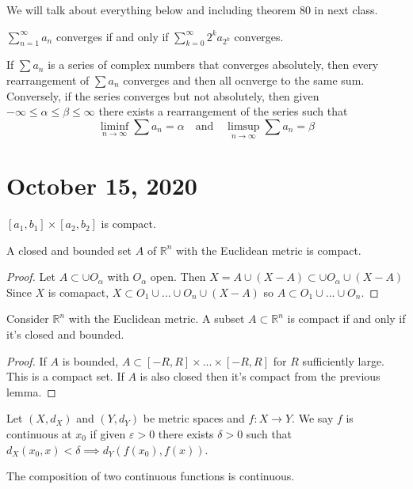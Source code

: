 \documentclass{article}
\newcommand{\R}{\mathbb{R}}
\newcommand{\eps}{\varepsilon}
\newcommand{\ra}[1][]{\xrightarrow{#1}}
\begin{document}
We will talk about everything below and including theorem 80 in next class.
\begin{theorem}
$\sum_{n=1}^\infty a_n$ converges if and only if $\sum_{k=0}^\infty 2^ka_{2^k}$ converges.
\end{theorem}
\begin{theorem}
If $\sum a_n$ is a series of complex numbers that converges absolutely, then every rearrangement of $\sum a_n$ converges and then all ocnverge to the same sum. Conversely, if the series converges but not absolutely, then given $-\infty\leq\alpha\leq\beta\leq\infty$ there exists a rearrangement of the series such that $$\liminf_{n\ra\infty} \sum a_n=\alpha\quad \textrm{and} \quad \limsup_{n\ra\infty}\sum a_n=\beta$$
\end{theorem}
\section{October 15, 2020}
\begin{lemma}
$[a_1,b_1]\times[a_2,b_2]$ is compact.
\end{lemma}
\begin{lemma}
A closed and bounded set $A$ of $\R^n$ with the Euclidean metric is compact.
\end{lemma}
\begin{proof}
Let $A\subset\cup O_\alpha$ with $O_\alpha$ open. Then $X=A\cup (X-A)\subset \cup O_\alpha\cup (X-A)$ Since $X$ is comapact, $X\subset O_1\cup...\cup O_n\cup (X-A)$ so $A\subset O_1\cup...\cup O_n$.
\end{proof}
\begin{theorem}
Consider $\R^n$ with the Euclidean metric. A subset $A\subset \R^n$ is compact if and only if it's closed and bounded.
\end{theorem}
\begin{proof}
If $A$ is bounded, $A\subset[-R,R]\times...\times[-R,R]$ for $R$ sufficiently large. This is a compact set. If $A$ is also closed then it's compact from the previous lemma.
\end{proof}
\begin{definition}
Let $(X,d_X)$ and $(Y,d_Y)$ be metric spaces and $f:X\ra Y$. We say $f$ is continuous at $x_0$ if given $\eps>0$ there exists $\delta>0$ such that $d_X(x_0,x)<\delta\implies d_Y(f(x_0),f(x))$.
\end{definition}
\begin{lemma}
The composition of two continuous functions is continuous.
\end{lemma}
\end{document}
